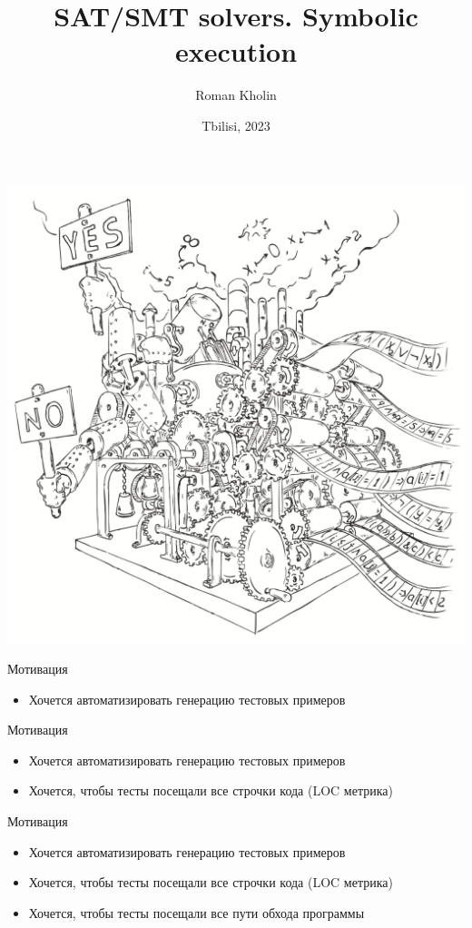 \documentclass{beamer}
\begin{document}
\title{SAT/SMT solvers. Symbolic execution}
\author{Roman Kholin}
\date{Tbilisi, 2023}

\begin{frame}
\includegraphics[scale=0.5]{../decision-procedure.png}
\end{frame}

\frame{\titlepage}

\begin{frame}{Мотивация}
\begin{itemize}
\item Хочется автоматизировать генерацию тестовых примеров
\end{itemize}
\end{frame}

\begin{frame}{Мотивация}
\begin{itemize}
\item Хочется автоматизировать генерацию тестовых примеров
\item Хочется, чтобы тесты посещали все строчки кода (LOC метрика)
\end{itemize}
\end{frame}

\begin{frame}{Мотивация}
\begin{itemize}
\item Хочется автоматизировать генерацию тестовых примеров
\item Хочется, чтобы тесты посещали все строчки кода (LOC метрика)
\item Хочется, чтобы тесты посещали все пути обхода программы
\end{itemize}
\end{frame}
\end{document}
